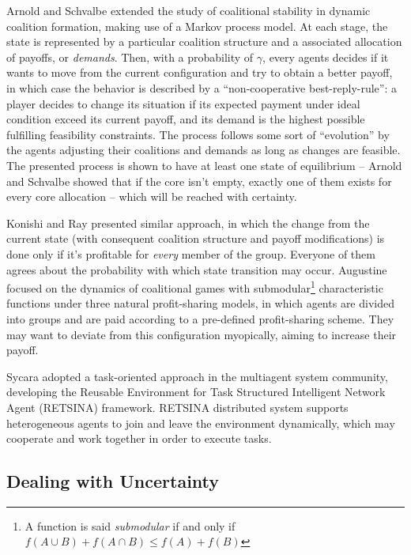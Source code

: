 \documentclass[11pt, twoside, titlepage, a4paper, openright]{report}
\begin{document}
Arnold and Schvalbe \cite{Arnold_Schwalbe_2002} extended the study of coalitional stability in dynamic coalition formation, making use of a Markov process model. At each stage, the state is represented by a particular coalition structure and a associated allocation of payoffs, or \textit{demands}. Then, with a probability of $\gamma$, every agents decides if it wants to move from the current configuration and try to obtain a better payoff, in which case the behavior is described by a ``non-cooperative best-reply-rule'': a player decides to change its situation if its expected payment under ideal condition exceed its current payoff, and its demand is the highest possible fulfilling feasibility constraints. The process follows some sort of ``evolution'' by the agents adjusting their coalitions and demands as long as changes are feasible.
The presented process is shown to have at least one state of equilibrium -- Arnold and Schvalbe showed that if the core isn't empty, exactly one of them exists for every core allocation -- which will be reached with certainty.

Konishi and Ray \cite{Konishi20031} presented similar approach, in which the change from the current state (with consequent coalition structure and payoff modifications) is done only if it's profitable for \textit{every} member of the group. Everyone of them agrees about the probability with which state transition may occur.
Augustine \cite{DBLP:conf/ijcai/AugustineCEFGS11} focused on the dynamics of coalitional games with submodular\footnote{A function is said \textit{submodular} if and only if $f (A \cup B) + f (A \cap B) \leq f (A) + f (B)$} characteristic functions  under three natural profit-sharing models, in which agents are divided into groups and are paid according to a pre-defined profit-sharing scheme. They may want to deviate from this configuration myopically, aiming to increase their payoff.

Sycara \cite{Sycara:1996:DIA:629553.630174,Liu_1996_410} adopted a task-oriented approach in the multiagent system community, developing the Reusable Environment for Task Structured Intelligent Network Agent (RETSINA) framework. RETSINA distributed system supports heterogeneous agents to join and leave the environment dynamically, which may cooperate and work together in order to execute tasks.

\subsection{Dealing with Uncertainty}
\end{document}

